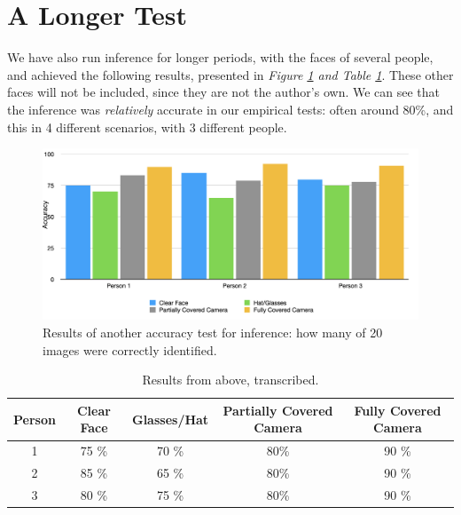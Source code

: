 \newpage
\section{A Longer Test}
We have also run inference for longer periods, with the faces of several people, and achieved the following results, presented in \textit{Figure \ref{fig:long_inference} and Table \ref{tab:inference_long_term}}. These other faces will not be included, since they are not the author's own. We can see that the inference was \textit{relatively} accurate in our empirical tests: often around 80\%, and this in 4 different scenarios, with 3 different people. 

\begin{figure}
    \centering
    \includegraphics[height = 7 cm]{figures/inference_long_test}
    \caption{Results of another accuracy test for inference: how many of 20 images were correctly identified.}
    \label{fig:long_inference}
    \quad
\end{figure}
\begin{table}
    \centering
    \begin{tabular}{|c|c|c|c|c|}
        \hline
        Person & Clear Face & Glasses/Hat & Partially Covered Camera & Fully Covered Camera  \\ \hline
        1 & 75 \% & 70 \% & 80\% & 90 \% \\ \hline
        2 & 85 \% & 65 \% & 80\% & 90 \% \\ \hline
        3 & 80 \% & 75 \% & 80\% & 90 \% \\ \hline
    \end{tabular}
    \caption{Results from above, transcribed.}
    \label{tab:inference_long_term}
\end{table}

